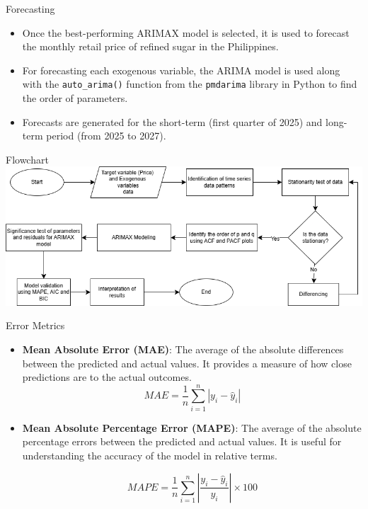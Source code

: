 \documentclass[12pt, aspectratio=169]{beamer}
\begin{document}
\begin{frame}{Forecasting}
    \begin{itemize}
        \item Once the best-performing ARIMAX model is selected, it is used to forecast the monthly retail price of refined sugar in the Philippines.
        \item For forecasting each exogenous variable, the ARIMA model is used along with the \texttt{auto\_arima()} function from the \texttt{pmdarima} library in Python to find the order of parameters.
        \item Forecasts are generated for the short-term (first quarter of 2025) and long-term period (from 2025 to 2027).
    \end{itemize}
\end{frame}

\begin{frame}{Flowchart}
    \includegraphics[width=\textwidth]{flowchart.png}
\end{frame}

\begin{frame}{Error Metrics}

\begin{itemize}
    \item \textbf{Mean Absolute Error (MAE)}: The average of the absolute differences between the predicted and actual values. It provides a measure of how close predictions are to the actual outcomes. 
    $$
        MAE = \frac{1}{n} \sum_{i=1}^{n} |y_{i} - \hat{y}_{i}|  
    $$
    

    \item \textbf{Mean Absolute Percentage Error (MAPE)}: The average of the absolute percentage errors between the predicted and actual values. It is useful for understanding the accuracy of the model in relative terms.

    $$
        MAPE = \frac{1}{n} \sum_{i=1}^{n} \left| \frac{y_{i} - \hat{y}_{i}}{y_{i}} \right| \times 100  
    $$
\end{itemize}
\end{frame}
\end{document}
